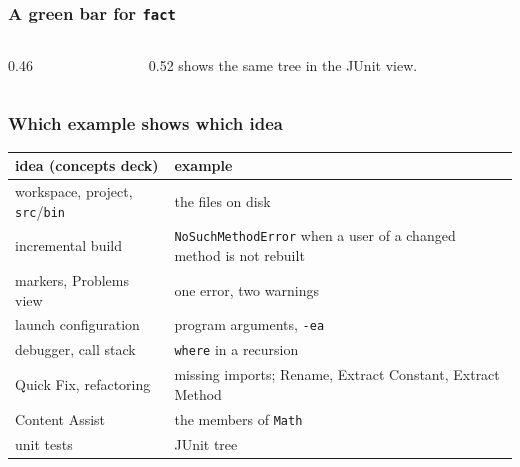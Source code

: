 \documentclass[aspectratio=169,10pt,compress]{beamer}
\begin{document}
\begin{frame}[t,fragile] \frametitle{A green bar for \texttt{fact}}
  \begin{columns}[T]
    \begin{column}{0.46\textwidth}
    \end{column}
    \begin{column}{0.52\textwidth}
      \small {} shows the same tree in the JUnit view.
    \end{column}
  \end{columns}
\end{frame}





\begin{frame}[t,fragile] \frametitle{Which example shows which idea}
  \begin{center}\small
  \begin{tabular}{ll}
    \toprule
    \textbf{idea (concepts deck)}               & \textbf{example} \\
    \midrule
    workspace, project, \texttt{src}/\texttt{bin} & the files on disk \\
    incremental build                           & \texttt{NoSuchMethodError} when a user of a changed method is not rebuilt \\
    markers, Problems view                      & one error, two warnings \\
    launch configuration                        & program arguments, \texttt{-ea} \\
    debugger, call stack                        & \texttt{where} in a recursion \\
    Quick Fix, refactoring                      & missing imports; Rename, Extract Constant, Extract Method \\
    Content Assist                              & the members of \texttt{Math} \\
    unit tests                                  & JUnit tree \\
    \bottomrule
  \end{tabular}
  \end{center}
\end{frame}
\end{document}
